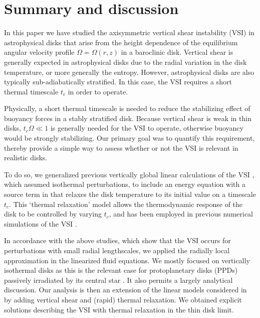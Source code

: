 \section{Summary and discussion}\label{summary}
In this paper we have studied the axisymmetric vertical shear 
instability (VSI) in astrophysical disks that arise from the 
height dependence of the equilibrium angular velocity profile 
$\Omega=\Omega(r,z)$ in a baroclinic disk. Vertical shear is generally
expected in astrophysical disks due to the radial variation in the
disk temperature, or more generally the entropy. However, 
astrophysical disks are also typically sub-adiabatically stratified. 
In this case, the VSI requires a short thermal timescale $t_c$ in
order to operate.  

Physically, a short thermal timescale is needed to reduce the  
stabilizing effect of buoyancy forces in a stably stratified
disk. Because vertical shear is weak in thin disks, $t_c\Omega\ll 1$
is generally needed for the VSI to operate, otherwise buoyancy would
be strongly stabilizing. Our primary goal was to quantify this
requirement, thereby provide a simple way to assess 
whether or not the VSI is relevant in realistic disks. 

To do so, we generalized previous vertically global linear 
calculations of the VSI , which
assumed isothermal perturbations, to include an energy equation with 
a source term in that relaxes the disk
temperature to its initial value on a timescale
$t_c$. This `thermal relaxation' model allows
the thermodynamic response of the disk to be controlled by varying
$t_c$, and has been employed in previous numerical simulations of the
VSI .  

In accordance with the above studies, which show that the VSI occurs for 
perturbations with small radial lengthscales, we applied the 
radially local approximation in the linearized fluid equations. 
We mostly focused on vertically isothermal disks as 
this is the relevant case for protoplanetary disks (PPDs) passively
irradiated by its central star \citep{chiang97}. It also permits a
largely analytical discussion. Our analysis is then an extension of the
linear models considered in \cite{lubow93} by adding vertical shear
and (rapid) thermal relaxation. We obtained explicit solutions 
describing the VSI with thermal relaxation in the thin disk limit.  

